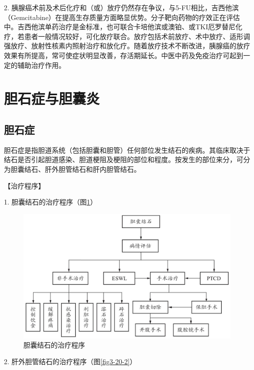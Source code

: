 2.
胰腺癌术前及术后化疗和（或）放疗仍然存在争议，与5-FU相比，吉西他滨（Gemcitabine）在提高生存质量方面略显优势。分子靶向药物的疗效正在评估中。吉西他滨单药治疗是金标准，也可联合卡培他滨或澳铂、或TKI厄罗替尼化疗，若患者一般情况较好，可化放疗联合。放疗包括术前放疗、术中放疗、适形调强放疗、放射性核素内照射治疗和放化疗。随着放疗技术不断改进，胰腺癌的放疗效果有所提高，常可使症状明显改善，存活期延长。中医中药及免疫治疗可起到一定的辅助治疗作用。

\section{胆石症与胆囊炎}

\subsection{胆石症}

胆石症是指胆道系统（包括胆囊和胆管）任何部位发生结石的疾病。其临床取决于结石是否引起胆道感染、胆道梗阻及梗阻的部位和程度。按发生的部位来分，可分为胆囊结石、肝外胆管结石和肝内胆管结石。

【治疗程序】

1. 胆囊结石的治疗程序（图\ref{fig3-20-1}）

\begin{figure}[!htbp]
 \centering
 \includegraphics{./images/Image00111.jpg}
 \captionsetup{justification=centering}
 \caption{胆囊结石的治疗程序}
 \label{fig3-20-1}
  \end{figure} 

2. 肝外胆管结石的治疗程序（图\ref{fig3-20-2}）

